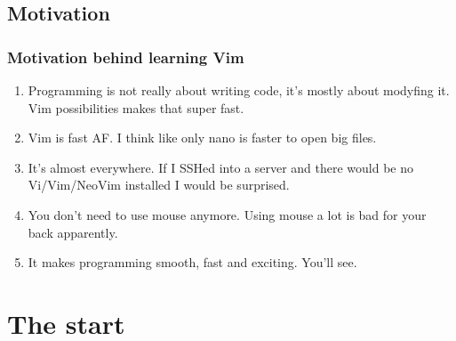 \documentclass{beamer}
\begin{document}
    \subsection{Motivation}
    \begin{frame}
    \frametitle{Motivation behind learning Vim} 
    \begin{enumerate}
        \item Programming is not really about writing code, it's mostly about modyfing it.
            Vim possibilities makes that super fast.
        \item Vim is fast AF. I think like only nano is faster to open big files.
        \item It's almost everywhere. If I SSHed into a server and there would be no
            Vi/Vim/NeoVim installed I would be surprised.
        \item You don't need to use mouse anymore. Using mouse a lot is bad for your back 
            apparently.
        \item It makes programming smooth, fast and exciting. You'll see.
    \end{enumerate}
    \end{frame}
    \section{The start}
\end{document}
